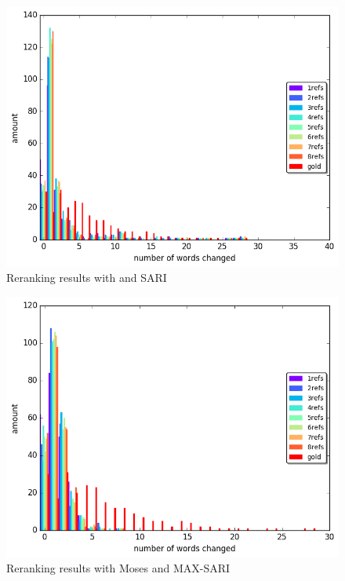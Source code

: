 \documentclass[letterpaper, 11pt]{article}
\begin{document}
\begin{figure}
\includegraphics[width=0.9\columnwidth]{nisioi_sari_words_differences_hist}
	\caption{Reranking results with  and SARI}

\end{figure}
\begin{figure}
	\includegraphics[width=0.9\columnwidth]{moses_max_words_differences_hist}
		\caption{Reranking results with Moses and MAX-SARI}
	
\end{figure}
\end{document}
